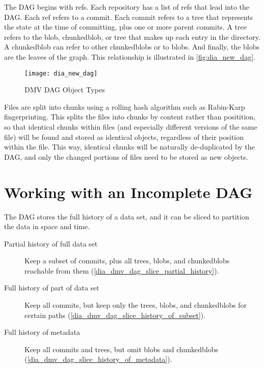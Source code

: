 The \gls{DAG} begins with \glspl{ref}. Each repository has a list of \glspl{ref}
that lead into the \gls{DAG}. Each \gls{ref} refers to a \gls{commit}. Each
\gls{commit} refers to a \gls{tree} that represents the state at the time of
committing, plus one or more parent \glspl{commit}. A \gls{tree} refers to the
\gls{blob}, \gls{chunkedblob}, or \gls{tree} that makes up each entry in the
directory. A \gls{chunkedblob} can refer to other \glspl{chunkedblob} or to
\glspl{blob}. And finally, the \glspl{blob} are the leaves of the graph. This
relationship is illustrated in \autoref{fig:dia_new_dag}.

\begin{figure}[]
    \centering
        \texttt{[image: dia\_new\_dag]}
    \caption{DMV DAG Object Types}
    \label{fig:dia_new_dag}
\end{figure}


Files are split into chunks using a rolling hash algorithm such as Rabin-Karp
fingerprinting\cite{rabin_karp_fingerprinting}. This splits the files into
chunks by content rather than positition, so that identical chunks within files
(and especially different versions of the same file) will be found and stored as
identical objects, regardless of their position within the file. This way,
identical chunks will be naturally de-duplicated by the \gls{DAG}, and only the
changed portions of files need to be stored as new objects.

%


\section{Working with an Incomplete DAG}

The \gls{DAG} stores the full history of a data set, and it can be sliced to
partition the data in space and time.

\begin{description}

    \item[Partial history of full data set] Keep a subset of \glspl{commit},
        plus all \glspl{tree}, \glspl{blob}, and \glspl{chunkedblob} reachable
        from them (\autoref{dia_dmv_dag_slice_partial_history}).

    \item[Full history of part of data set] Keep all \glspl{commit}, but keep
        only the \glspl{tree}, \glspl{blob}, and \glspl{chunkedblob} for certain
        paths (\autoref{dia_dmv_dag_slice_history_of_subset}).

    \item[Full history of metadata] Keep all \glspl{commit} and \glspl{tree},
        but omit \glspl{blob} and \glspl{chunkedblob}
        (\autoref{dia_dmv_dag_slice_history_of_metadata}).

\end{description}

